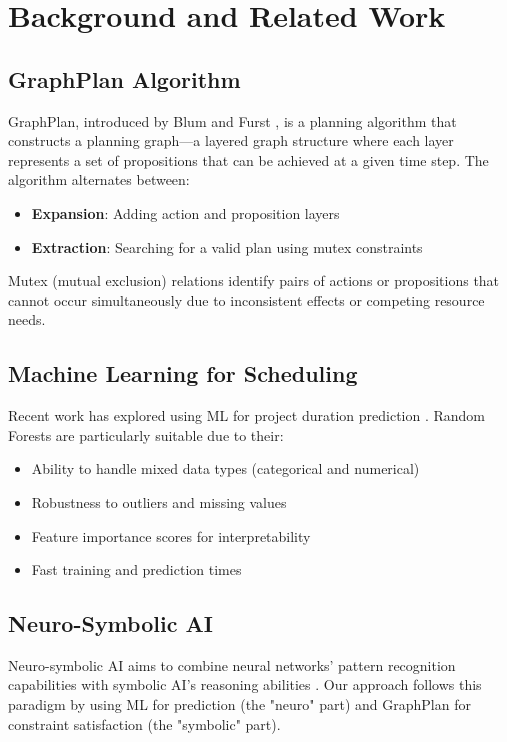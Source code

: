 \documentclass[11pt,a4paper]{article}
\begin{document}
\section{Background and Related Work}
\label{sec:background}

\subsection{GraphPlan Algorithm}

GraphPlan, introduced by Blum and Furst \cite{blum1997fast}, is a planning algorithm that constructs a planning graph—a layered graph structure where each layer represents a set of propositions that can be achieved at a given time step. The algorithm alternates between:

\begin{itemize}
    \item \textbf{Expansion}: Adding action and proposition layers
    \item \textbf{Extraction}: Searching for a valid plan using mutex constraints
\end{itemize}

Mutex (mutual exclusion) relations identify pairs of actions or propositions that cannot occur simultaneously due to inconsistent effects or competing resource needs.

\subsection{Machine Learning for Scheduling}

Recent work has explored using ML for project duration prediction \cite{zhang2019machine}. Random Forests are particularly suitable due to their:
\begin{itemize}
    \item Ability to handle mixed data types (categorical and numerical)
    \item Robustness to outliers and missing values
    \item Feature importance scores for interpretability
    \item Fast training and prediction times
\end{itemize}

\subsection{Neuro-Symbolic AI}

Neuro-symbolic AI aims to combine neural networks' pattern recognition capabilities with symbolic AI's reasoning abilities \cite{garcez2020neural}. Our approach follows this paradigm by using ML for prediction (the "neuro" part) and GraphPlan for constraint satisfaction (the "symbolic" part).
\end{document}

